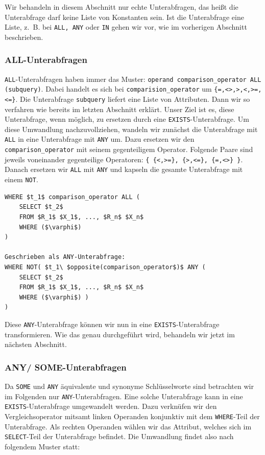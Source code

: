 Wir behandeln in diesem Abschnitt nur echte Unterabfragen, das heißt die Unterabfrage darf keine Liste von Konstanten sein. Ist die Unterabfrage eine Liste, \mbox{z. B.} bei \verb|ALL, ANY| oder \verb|IN| gehen wir vor, wie im vorherigen Abschnitt beschrieben.

\subsubsection*{ALL-Unterabfragen}

\verb|ALL|-Unterabfragen haben immer das Muster: \verb|operand comparison_operator ALL (subquery)|. Dabei handelt es sich bei \verb|comparision_operator| um \verb|{=,<>,>,<,>=,<=}|. Die Unterabfrage \verb|subquery| liefert eine Liste von Attributen. Dann wir so verfahren wie bereits im letzten Abschnitt erklärt. Unser Ziel ist es, diese Unterabfrage, wenn möglich, zu ersetzen durch eine \verb|EXISTS|-Unterabfrage. Um diese Umwandlung nachzuvollziehen, wandeln wir zunächst die Unterabfrage mit \verb|ALL| in eine Unterabfrage mit \verb|ANY| um. Dazu ersetzen wir den \verb|comparison_operator| mit seinem gegenteiligem Operator. Folgende Paare sind jeweils voneinander gegenteilige Operatoren: \verb|{ {<,>=}, {>,<=}, {=,<>} }|. Danach ersetzen wir \verb|ALL| mit \verb|ANY| und kapseln die gesamte Unterabfrage mit einem \verb|NOT|. 

\begin{lstlisting}[mathescape]
WHERE $t_1$ comparison_operator ALL (
	SELECT $t_2$
	FROM $R_1$ $X_1$, ..., $R_n$ $X_n$
	WHERE ($\varphi$)
)

Geschrieben als ANY-Unterabfrage:
WHERE NOT( $t_1\ $opposite(comparison_operator$)$ ANY (
	SELECT $t_2$
	FROM $R_1$ $X_1$, ..., $R_n$ $X_n$
	WHERE ($\varphi$) ) 
)
\end{lstlisting}

Diese \verb|ANY|-Unterabfrage können wir nun in eine \verb|EXISTS|-Unterabfrage transformieren. Wie das genau durchgeführt wird, behandeln wir jetzt im nächsten Abschnitt.


\subsubsection*{ANY/ SOME-Unterabfragen}

Da \verb|SOME| und \verb|ANY| äquivalente und synonyme Schlüsselworte sind betrachten wir im Folgenden nur \verb|ANY|-Unterabfragen. Eine solche Unterabfrage kann in eine \verb|EXISTS|-Unterabfrage umgewandelt werden. Dazu verknüfen wir den Vergleichsoperator mitsamt linken Operanden konjunktiv mit dem \verb|WHERE|-Teil der Unterabfrage. Als rechten Operanden wählen wir das Attribut, welches sich im \verb|SELECT|-Teil der Unterabfrage befindet. Die Umwandlung findet also nach folgendem Muster statt:

